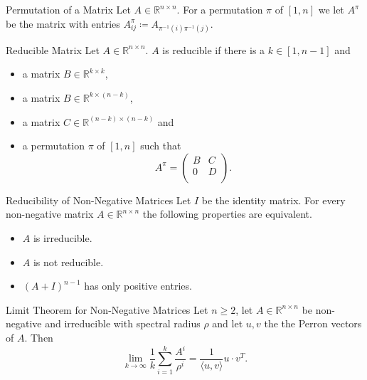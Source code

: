 \documentclass[english]{panikzettel}
\begin{document}
\begin{halfboxl}
\vspace{-\baselineskip}
	\begin{defi}{Permutation of a Matrix}
	Let $A\in\mathbb{R}^{n\times n}$. For a permutation $\pi$ of $[1,n]$ we let $A^\pi$ be the matrix with entries $A_{ij}^\pi\coloneqq A_{\pi^{-1}(i)\pi^{-1}(j)}$.
	\end{defi}

	
	\begin{defi}{Reducible Matrix}
	Let $A\in\mathbb{R}^{n\times n}$. $A$ is reducible if there is a $k\in[1,n-1]$ and
	\begin{itemize}
	\item a matrix $B\in\mathbb{R}^{k\times k}$,
	\item a matrix $B\in\mathbb{R}^{k\times (n-k)}$,
	\item a matrix $C\in\mathbb{R}^{(n-k)\times (n-k)}$ and
	\item a permutation $\pi$ of $[1,n]$ such that
	\vspace{-0.5\baselineskip}
	\[
	A^\pi=
	\begin{pmatrix}
	B & C\\
	0 & D\\
	\end{pmatrix}.
	\]
	\end{itemize}
	\end{defi}
	
\end{halfboxl}
\begin{halfboxr}
\vspace{-\baselineskip}
	
	\begin{theo}{Reducibility of Non-Negative Matrices}
	Let $I$ be the identity matrix. For every non-negative matrix $A\in\mathbb{R}^{n\times n}$ the following properties are equivalent.
	\begin{itemize}
	\item $A$ is irreducible.
	\item $A$ is not reducible.
	\item $(A+I)^{n-1}$ has only positive entries.
	\end{itemize}
	\end{theo}

	\begin{theo}{Limit Theorem for Non-Negative Matrices}
	Let $n\geq 2$, let $A\in\mathbb{R}^{n\times n}$ be non-negative and irreducible with spectral radius $\rho$ and let $u,v$ the the Perron vectors of $A$. Then
	\[
	\lim_{k\to\infty}\frac{1}{k}\sum_{i=1}^k \frac{A^i}{\rho^i}=\frac{1}{\langle u,v \rangle} u\cdot v^T.
	\]
	\end{theo}
\end{halfboxr}
\end{document}

